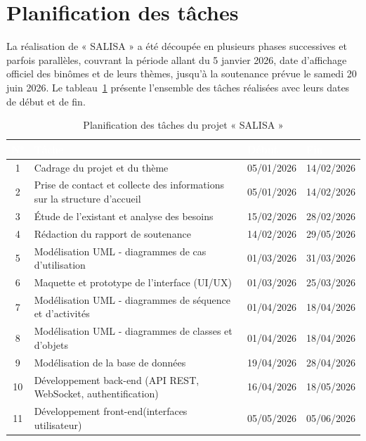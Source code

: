 \section{Planification des tâches}

La réalisation de « SALISA » a été découpée en plusieurs phases successives et parfois parallèles,
couvrant la période allant du 5 janvier 2026, date d'affichage officiel des binômes et de leurs
thèmes, jusqu'à la soutenance prévue le samedi 20 juin 2026. Le tableau~\ref{tab:planification}
présente l'ensemble des tâches réalisées avec leurs dates de début et de fin.

\begin{table}[H]
	\caption{Planification des tâches du projet « SALISA »}
	\label{tab:planification}
	\centering
	\begin{tabular}{|c|p{6.2cm}|p{2.4cm}|p{2.4cm}|}
		\hline
		\rowcolor{vertCongo}
		\textcolor{white}{\textbf{N°}} &
		\textcolor{white}{\textbf{Tâche}} &
		\textcolor{white}{\textbf{Début}} &
		\textcolor{white}{\textbf{Fin}} \\
		\hline
		1 & Cadrage du projet et du thème & 05/01/2026 & 14/02/2026 \\
		\hline
		2 & Prise de contact et collecte des informations sur la structure d'accueil & 05/01/2026 & 14/02/2026 \\
		\hline
		3 & Étude de l'existant et analyse des besoins & 15/02/2026 & 28/02/2026 \\
		\hline
		4 & Rédaction du rapport de soutenance & 14/02/2026 & 29/05/2026 \\
		\hline
		5 & Modélisation UML - diagrammes de cas d'utilisation & 01/03/2026 & 31/03/2026 \\
		\hline
		6 & Maquette et prototype de l'interface (UI/UX) & 01/03/2026 & 25/03/2026 \\
		\hline
		7 & Modélisation UML - diagrammes de séquence et d'activités & 01/04/2026 & 18/04/2026 \\
		\hline
		8 & Modélisation UML - diagrammes de classes et d'objets & 01/04/2026 & 18/04/2026 \\
		\hline
		9 & Modélisation de la base de données & 19/04/2026 & 28/04/2026 \\
		\hline
		10 & Développement back-end (API REST, WebSocket, authentification) & 16/04/2026 & 18/05/2026 \\
		\hline
		11 & Développement front-end\newline (interfaces utilisateur) & 05/05/2026 & 05/06/2026 \\

\end{tabular}
\end{table}
